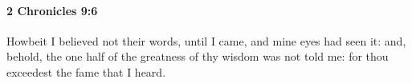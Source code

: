 
		\paragraph{2 Chronicles 9:6} %
			\label{2CHRONICLES-9-6}

			Howbeit I believed not their words, until I came, and mine eyes had seen it: and, behold, the one half of the greatness of thy wisdom was not told me: for thou exceedest the fame that I heard.



